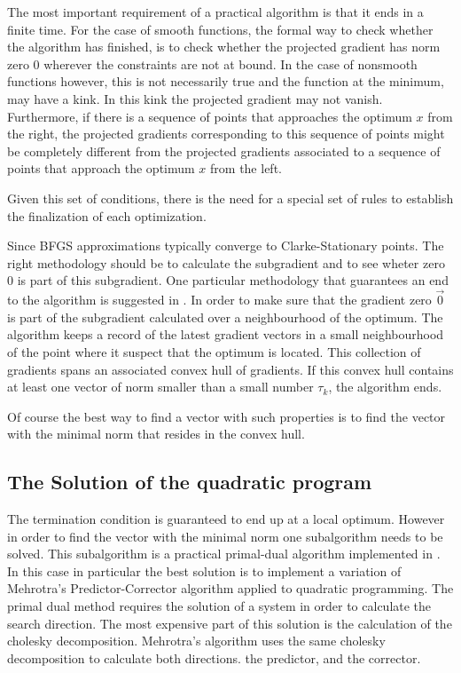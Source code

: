 The most important requirement of a practical algorithm is that it ends in a finite time. For the case of smooth functions, the formal way to check whether the algorithm has finished, is to check whether the projected gradient has norm zero $0$ wherever the constraints are not at bound. In the case of nonsmooth functions however, this is not necessarily true and the function at the minimum, may have a kink. In this kink the projected gradient may not vanish. Furthermore, if there is a sequence of points that approaches the optimum $x$ from the right, the projected gradients corresponding to this sequence of points might be completely different from the projected gradients associated to a sequence of points that approach the optimum $x$ from the left.

Given this set of conditions, there is the need for a special set of rules to establish the finalization of each optimization.

Since BFGS approximations typically converge to Clarke-Stationary points. The right methodology should be to calculate the subgradient and to see wheter zero $0$ is part of this subgradient. One particular methodology that guarantees an end to the algorithm is suggested in \citep{overtonlewis}. In order to make sure that the gradient zero $\vec{0}$ is part of the subgradient calculated over a neighbourhood of the optimum. The algorithm keeps a record of the latest gradient vectors in a small neighbourhood of the point where it suspect that the optimum is located. This collection of gradients spans an associated convex hull of gradients. If this convex hull contains at least one vector of norm smaller than a small number $\tau_k$, the algorithm ends.

Of course the best way to find a vector with such properties is to find the vector with the minimal norm that resides in the convex hull.

\subsection{The Solution of the quadratic program}

The termination condition is guaranteed to end up at a local optimum. However in order to find the vector with the minimal norm one subalgorithm needs to be solved. This subalgorithm is a practical primal-dual algorithm implemented in \citep{skaaja}. In this case in particular the best solution is to implement a variation of Mehrotra's Predictor-Corrector algorithm applied to quadratic programming. The primal dual method requires the solution of a system in order to calculate the search direction. The most expensive part of this solution is the calculation of the cholesky decomposition. Mehrotra's algorithm uses the same cholesky decomposition to calculate both directions. the predictor, and the corrector.

